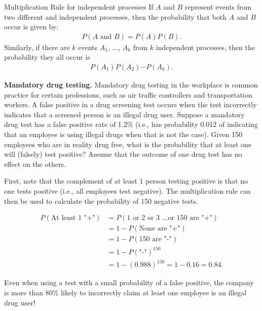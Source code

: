 \textD{\newpage}

\begin{onebox}{Multiplication Rule for independent processes}
%
If $A$ and $B$ represent events from two different and independent processes, then the probability that both $A$ and $B$ occur is given by: \vspace{-1.5mm}
\begin{eqnarray}\label{eqForIndependentEvents}
P(A \text{ and }B) = P(A)  P(B).
\end{eqnarray}
Similarly, if there are $k$ events $A_1$, ..., $A_k$ from $k$ independent processes, then the probability they all occur is\vspace{-1.5mm}
\begin{eqnarray*}
P(A_1) P(A_2) \cdots P(A_k).
\end{eqnarray*}
\end{onebox}

\begin{examplewrap}
\begin{nexample}{\textbf{Mandatory drug testing.} Mandatory drug testing in the workplace is common practice for certain professions, such as air traffic controllers and transportation workers.  A false positive in a drug screening test occurs when the test incorrectly indicates that a screened person is an illegal drug user. Suppose a mandatory drug test has a false positive rate of 1.2\% (i.e., has probability  0.012 of indicating that an employee is using illegal drugs when that is not the case).  Given 150 employees who are in reality drug free, what is the probability that at least one will (falsely) test positive? Assume that the outcome of one drug test has no effect on the others.}

First, note that the complement of at least 1 person testing positive is that no one tests positive (i.e., all employees test negative). The multiplication rule can then be used to calculate the probability of 150 negative tests.

   \begin{align*} 
   P(\text{At least 1 "+"}) &= P(\text{1 or 2 or 3 \ldots or 150 are "+"}) \\
           &= 1 - P(\text{None are "+"}) \\
           & = 1 - P(\text{150 are "-"}) \\
		   &= 1 - P(\text{"-"})^{150} \\
           &= 1 - (0.988)^{150} = 1 - 0.16 = 0.84.
    \end{align*}
 
Even when using a test with a small probability of a false positive, the company is more than 80\% likely to incorrectly claim at least one employee is an illegal drug user!
\end{nexample}
\end{examplewrap}

